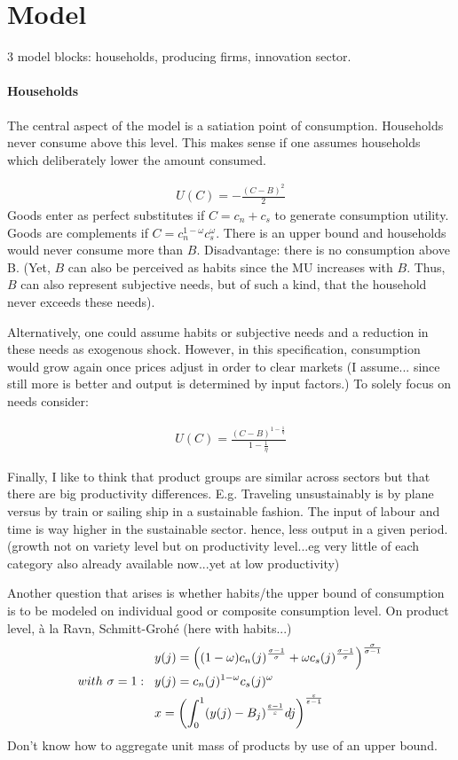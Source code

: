 \section{Model}

3 model blocks: households, producing firms, innovation sector.

\paragraph{Households}
The central aspect of the model is a satiation point of consumption. Households never consume above this level. This makes sense if one assumes households which deliberately lower the amount consumed. 

\begin{align*}
U(C)= -\frac{(C-B)^2}{2} 
\end{align*}
Goods enter as perfect substitutes if $C=c_n+c_s$ to generate consumption utility.
Goods are complements if $C=c_n^{1-\omega}c_s^\omega$.
 There is an upper bound and households would never consume more than $B$. Disadvantage: there is no consumption above B.  (Yet, $B$ can also be perceived as habits since the MU increases with $B$. Thus, $B$ can also represent subjective needs, but of such a kind, that the household never exceeds these needs). 


Alternatively, one could assume habits or subjective needs and a reduction in these needs as exogenous shock. However, in this specification, consumption would grow again once prices adjust in order to clear markets (I assume... since still more is better and output is determined by input factors.)
To solely focus on needs consider:

\begin{align*}
	U(C)= \frac{(C-B)^{1-\frac{1}{\eta}}}{1-\frac{1}{\eta}}
\end{align*}


Finally, I like to think that product groups are similar across sectors but that there are big productivity differences. E.g. Traveling unsustainably is by plane versus by train or sailing ship in a sustainable fashion. The input of labour and time is way higher in the sustainable sector. hence, less output in a given period. (growth not on variety level but on productivity level...eg very little of each category also already available now...yet at low productivity)


Another question that arises is whether habits/the upper bound of consumption is to be modeled on individual good or composite consumption level.
On product level, à la Ravn, Schmitt-Grohé (here with habits...)
\begin{align*}
&y(j)=\left((1-\omega)c_n(j)^{\frac{\sigma-1}{\sigma}} +\omega c_s(j)^{\frac{\sigma-1}{\sigma}}\right)^\frac{\sigma}{\sigma-1}\\
with\ \sigma =1: \hspace{3mm}& y(j)=c_n(j)^{1-\omega}c_s(j)^\omega \\
&	x= \left(\int_{0}^{1} (y(j)- B_j)^{\frac{\varepsilon-1}{\varepsilon}}dj\right)^{\frac{\varepsilon}{\varepsilon-1}}
\end{align*}
Don't know how to aggregate unit mass of products by use of an upper bound. 

